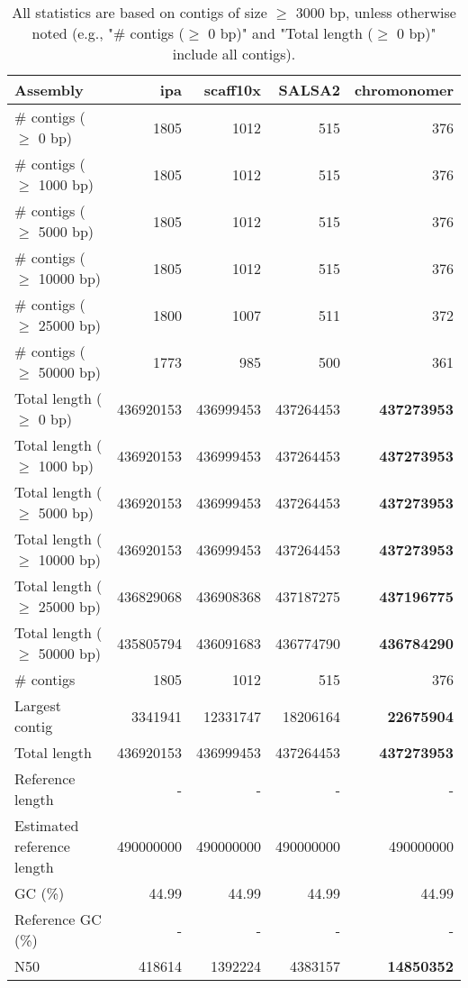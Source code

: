 \documentclass[12pt,a4paper]{article}
\begin{document}
\begin{table}[ht]
\begin{center}
\caption{All statistics are based on contigs of size $\geq$ 3000 bp, unless otherwise noted (e.g., "\# contigs ($\geq$ 0 bp)" and "Total length ($\geq$ 0 bp)" include all contigs).}
\begin{tabular}{|l*{4}{|r}|}
\hline
Assembly & ipa & scaff10x & SALSA2 & chromonomer \\ \hline
\# contigs ($\geq$ 0 bp) & 1805 & 1012 & 515 & 376 \\ \hline
\# contigs ($\geq$ 1000 bp) & 1805 & 1012 & 515 & 376 \\ \hline
\# contigs ($\geq$ 5000 bp) & 1805 & 1012 & 515 & 376 \\ \hline
\# contigs ($\geq$ 10000 bp) & 1805 & 1012 & 515 & 376 \\ \hline
\# contigs ($\geq$ 25000 bp) & 1800 & 1007 & 511 & 372 \\ \hline
\# contigs ($\geq$ 50000 bp) & 1773 & 985 & 500 & 361 \\ \hline
Total length ($\geq$ 0 bp) & 436920153 & 436999453 & 437264453 & {\bf 437273953} \\ \hline
Total length ($\geq$ 1000 bp) & 436920153 & 436999453 & 437264453 & {\bf 437273953} \\ \hline
Total length ($\geq$ 5000 bp) & 436920153 & 436999453 & 437264453 & {\bf 437273953} \\ \hline
Total length ($\geq$ 10000 bp) & 436920153 & 436999453 & 437264453 & {\bf 437273953} \\ \hline
Total length ($\geq$ 25000 bp) & 436829068 & 436908368 & 437187275 & {\bf 437196775} \\ \hline
Total length ($\geq$ 50000 bp) & 435805794 & 436091683 & 436774790 & {\bf 436784290} \\ \hline
\# contigs & 1805 & 1012 & 515 & 376 \\ \hline
Largest contig & 3341941 & 12331747 & 18206164 & {\bf 22675904} \\ \hline
Total length & 436920153 & 436999453 & 437264453 & {\bf 437273953} \\ \hline
Reference length & - & - & - & - \\ \hline
Estimated reference length & 490000000 & 490000000 & 490000000 & 490000000 \\ \hline
GC (\%) & 44.99 & 44.99 & 44.99 & 44.99 \\ \hline
Reference GC (\%) & - & - & - & - \\ \hline
N50 & 418614 & 1392224 & 4383157 & {\bf 14850352} \\ \hline

\end{tabular}
\end{center}
\end{table}
\end{document}
